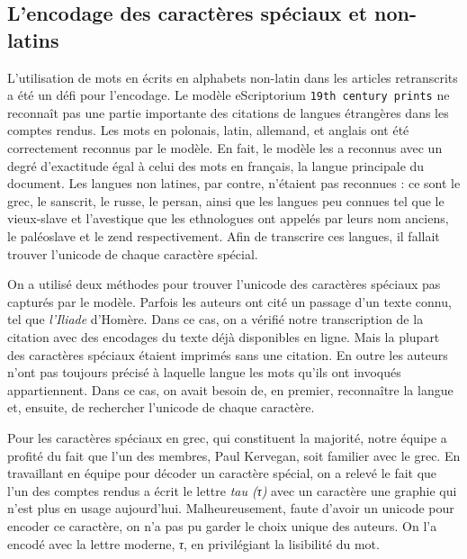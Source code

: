 \documentclass{article}
\begin{document}
	
	
	\subsection{L'encodage des caractères spéciaux et non-latins}
	
	L'utilisation de mots en écrits en alphabets non-latin dans les articles retranscrits a été un défi pour l’encodage. Le modèle eScriptorium \texttt{19th century prints} ne reconnaît pas une partie importante des citations de langues étrangères dans les comptes rendus. Les mots en polonais, latin, allemand, et anglais ont été correctement reconnus par le modèle. En fait, le modèle les a reconnus avec un degré d’exactitude égal à celui des mots en français, la langue principale du document. Les langues non latines, par contre, n’étaient pas reconnues : ce sont le grec, le sanscrit, le russe, le persan, ainsi que les langues peu connues tel que le vieux-slave et l’avestique que les ethnologues ont appelés par leurs nom anciens, le paléoslave et le zend respectivement. Afin de transcrire ces langues, il fallait trouver l’unicode de chaque caractère spécial.
	
	On a utilisé deux méthodes pour trouver l’unicode des caractères spéciaux pas capturés par le modèle. Parfois les auteurs ont cité un passage d’un texte connu, tel que \textit{l’Iliade} d'Homère. Dans ce cas, on a vérifié notre transcription de la citation avec des encodages du texte déjà disponibles en ligne. Mais la plupart des caractères spéciaux étaient imprimés sans une citation. En outre les auteurs n’ont pas toujours précisé à laquelle langue les mots qu’ils ont invoqués appartiennent. Dans ce cas, on avait besoin de, en premier, reconnaître la langue et, ensuite, de rechercher l’unicode de chaque caractère.
	
	Pour les caractères spéciaux en grec, qui constituent la majorité, notre équipe a profité du fait que l'un des membres, Paul Kervegan, soit familier avec le grec. En travaillant en équipe pour décoder un caractère spécial, on a relevé le fait que l’un des comptes rendus a écrit le lettre \textit{tau (τ)} avec un caractère une graphie qui n'est plus en usage aujourd'hui. Malheureusement, faute d'avoir un unicode pour encoder ce caractère, on n’a pas pu garder le choix unique des auteurs. On l’a encodé avec la lettre moderne, \textit{τ}, en privilégiant la lisibilité du mot.
	
\end{document}
